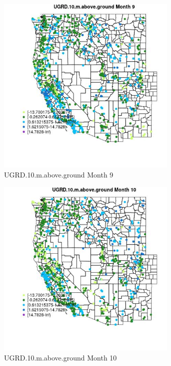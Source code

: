 \begin{figure} 
\centering  
\includegraphics[width=0.77\textwidth]{Code_Outputs/Report_ML_input_PM25_Step4_part_f_de_duplicated_aves_prioritize_24hr_obswNAs_MapObsMo9UGRD10maboveground.jpg} 
\caption{\label{fig:Report_ML_input_PM25_Step4_part_f_de_duplicated_aves_prioritize_24hr_obswNAsMapObsMo9UGRD10maboveground}UGRD.10.m.above.ground Month 9} 
\end{figure} 
 

\begin{figure} 
\centering  
\includegraphics[width=0.77\textwidth]{Code_Outputs/Report_ML_input_PM25_Step4_part_f_de_duplicated_aves_prioritize_24hr_obswNAs_MapObsMo10UGRD10maboveground.jpg} 
\caption{\label{fig:Report_ML_input_PM25_Step4_part_f_de_duplicated_aves_prioritize_24hr_obswNAsMapObsMo10UGRD10maboveground}UGRD.10.m.above.ground Month 10} 
\end{figure} 
 

